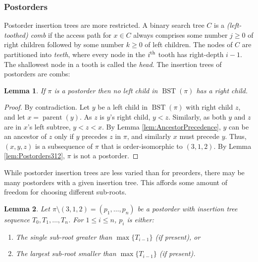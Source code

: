 \documentclass{article}
\theoremstyle{plain}
\newtheorem{lemma}{Lemma}
\theoremstyle{definition}
\DeclareMathOperator{\Parent}{parent}
\DeclareMathOperator{\BST}{BST}  %
\begin{document}
\subsubsection*{Postorders}

%
Postorder insertion trees are more restricted. A binary search tree $C$ is a
\emph{(left-toothed) comb} if the access path for $x\in C$ always comprises
some number $j\ge0$ of right children followed by some number $k\ge0$ of left
children. The nodes of $C$ are partitioned into \emph{teeth}, where every node
in the $i\textsuperscript{th}$ tooth has right-depth $i-1$. The shallowest node
in a tooth is called the \emph{head}. The insertion trees of postorders are
combs:

%
\begin{lemma}\label{lem:PostorderInsertionTrees}
If $\pi$ is a postorder then no left child in $\BST(\pi)$ has a right child.
\end{lemma}
\begin{proof}
By contradiction. Let $y$ be a left child in $\BST(\pi)$ with right child $z$,
and let $x=\Parent(y)$. As $z$ is $y$'s right child, $y<z$. Similarly, as both
$y$ and $z$ are in $x$'s left subtree, $y<z<x$. By Lemma
\ref{lem:AncestorPrecedence}, $y$ can be an ancestor of $z$ only if $y$
precedes $z$ in $\pi$, and similarly $x$ must precede $y$. Thus, $(x,y,z)$ is a
subsequence of $\pi$ that is order-isomorphic to $(3,1,2)$. By Lemma
\ref{lem:Postorders312}, $\pi$ is not a postorder.
\end{proof}

%
While postorder insertion trees are less varied than for preorders, there may be many postorders with a given insertion tree. This affords some amount of freedom for choosing different sub-roots.

%
\begin{lemma}\label{lem:PostorderSubroots}
Let $\pi\setminus(3,1,2)=(p_1,\dots,p_n)$ be a postorder with insertion tree sequence $T_0,T_1,\dots,T_n$. For $1\le i\le n$, $p_i$ is either: \item
\begin{enumerate}[label=\upshape(\alph*)]
%
\item\label{item:NewHead} The \emph{single} sub-root greater than
$\max\{T_{i-1}\}$ (if present), or
%
\item\label{item:CombHead} The largest sub-root smaller than $\max\{T_{i-1}\}$ (if present).
\end{enumerate}
\end{lemma}
\end{document}
